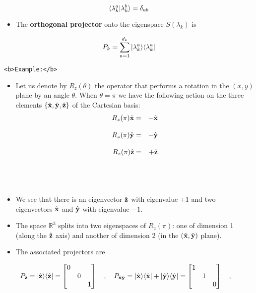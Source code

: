 \documentclass[11pt]{article}
\providecommand{\tightlist}{%
      \setlength{\itemsep}{0pt}\setlength{\parskip}{0pt}}
\begin{document}
\[
\langle \lambda_{k}^a|\lambda_{k}^b\rangle = \delta_{ab}
\]

    \begin{itemize}
\tightlist
\item
  The \textbf{orthogonal projector} onto the eigenspace \(S(\lambda_k)\)
  is
\end{itemize}

\[
P_k = \sum_{a=1}^{d_k} | \lambda_{k}^a\rangle \langle \lambda_{k}^a|
\]

    \begin{verbatim}
<b>Example:</b>
\end{verbatim}

\begin{itemize}
\tightlist
\item
  Let us denote by \(R_z(\theta)\) the operator that performs a rotation
  in the \((x,y)\) plane by an angle \(\theta\). When \(\theta = \pi\)
  we have the following action on the three elements
  \(\{\hat{\bf x}, \hat{\bf y}, \hat{\bf z}\}\) of the Cartesian basis:
  \\
  \begin{eqnarray}
  R_z(\pi)\hat{\bf x} &=& -\hat{\bf x}  \\ \rule{0mm}{6mm}
  R_z(\pi)\hat{\bf y} &=& -\hat{\bf y}  \\ \rule{0mm}{6mm}
  R_z(\pi)\hat{\bf z} &=& + \hat{\bf z}  
  \end{eqnarray}\\
  \strut \\
\item
  We see that there is an eigenvector \(\hat{\bf z}\) with eigenvalue
  \(+1\) and two eigenvectors \(\hat{\bf x}\) and \(\hat{\bf y}\) with
  eigenvalue \(-1\).
\item
  The space \({\mathbb R}^3\) splits into two eigenspaces of
  \(R_z(\pi)\): one of dimension 1 (along the \(\hat{\bf z}\) axis) and
  another of dimension 2 (in the \((\hat{\bf x}, \hat{\bf y})\) plane).
  \\
\item
  The associated projectors are
\end{itemize}

\[
P_{\hat{\bf z}}= |\hat{\bf z}\rangle\langle \hat{\bf z}|=\begin{bmatrix} 0 & & \\ & 0 & \\ & & 1 \end{bmatrix}~~~,~~~
P_{\hat{\bf x}\hat{\bf y}}= |\hat{\bf x}\rangle\langle \hat{\bf x}|+|\hat{\bf y}\rangle\langle \hat{\bf y}|=\begin{bmatrix} 1 & & \\ & 1 & \\ & & 0 \end{bmatrix}~~~,~~~
\]
\end{document}
